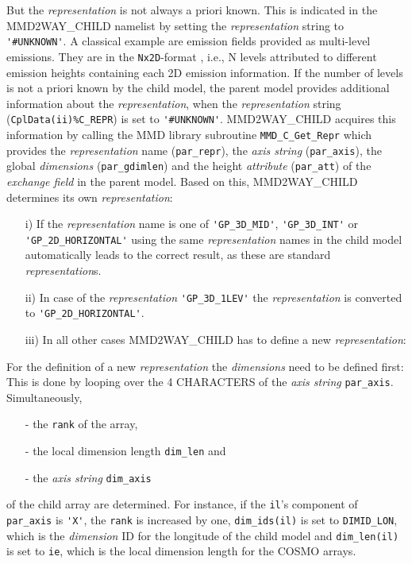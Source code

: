 \documentclass[11pt,twoside]{article}
\begin{document}
\begin{itemize}
\begin{enumerate}
\begin{itemize}
\begin{itemize}
But the {\it representation} is not always a priori known. This is indicated in
 the MMD2WAY\_CHILD namelist by setting the {\it representation} string to 
\verb|'#UNKNOWN'|.
 A classical example are emission fields provided as multi-level emissions. 
They are in the \verb|Nx2D|-format \citep[see][]{Kerkweg06a}, i.e., N 
levels 
attributed to different emission heights containing each 2D emission 
information.
 If the number of levels is not a priori known by the child
model, the parent model provides additional information about the
{\it representation}, when the {\it representation} string 
(\verb|CplData(ii)%C_REPR|) is set to \verb|'#UNKNOWN'|. 
MMD2WAY\_CHILD acquires this information by calling the MMD library subroutine
\verb|MMD_C_Get_Repr| which provides the {\it representation} name 
(\verb|par_repr|),
 the {\it axis string} (\verb|par_axis|), the global {\it dimensions}
 (\verb|par_gdimlen|)
and the height {\it attribute} (\verb|par_att|) of the 
{\it exchange field} in the parent model.
Based on this, MMD2WAY\_CHILD determines its own {\it representation}: 
\begin{enumerate}%
\item[i)] If the {\it representation} name is one of \verb|'GP_3D_MID'|, 
\verb|'GP_3D_INT'| or \verb|'GP_2D_HORIZONTAL'| using the same 
{\it representation} names in
the child model automatically leads to the correct result, 
as these are standard {\it representation}s. 
\item[ii)] In case of the {\it representation} \verb|'GP_3D_1LEV'| the 
{\it representation} is converted to \verb|'GP_2D_HORIZONTAL'|.
\item[iii)] In all other cases MMD2WAY\_CHILD has to define a new {\it representation}:
\end{enumerate}%

For the definition of a new {\it representation} 
the {\it dimensions} need to be defined first:\\
This is done by looping over the 4 {\footnotesize CHARACTERS} of the 
{\it axis string} \verb|par_axis|.
Simultaneously, 
\begin{itemize}%
\item[-] the \verb|rank| of the array, 
\item[-] the local dimension length \verb|dim_len| and 
\item[-] the {\it axis string} \verb|dim_axis| 
\end{itemize}%
of the child array are determined. 
For instance, if the \verb|il|'s component of \verb|par_axis| is \verb|'X'|, 
the \verb|rank| is increased by one, 
\verb|dim_ids(il)| is set to \verb|DIMID_LON|,
which is the {\it dimension} ID for the longitude of the child model and 
\verb|dim_len(il)| is set to \verb|ie|, which is the local dimension length for
the COSMO arrays. 


\end{itemize}
\end{itemize}
\end{enumerate}
\end{itemize}
\end{document}
